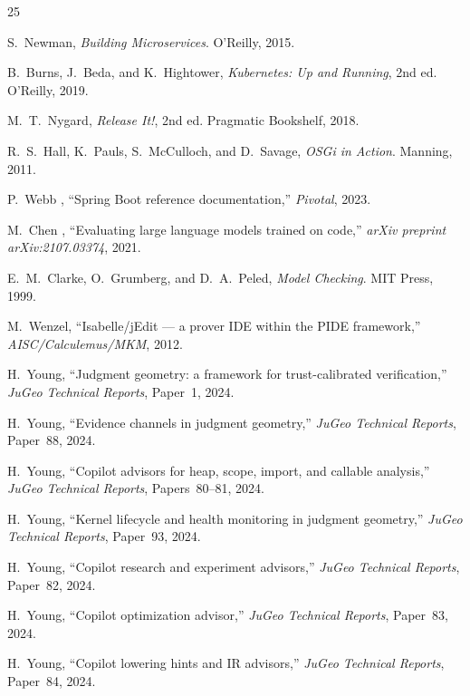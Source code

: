 \documentclass[11pt]{article}
\begin{document}
\begin{thebibliography}{25}

S.~Newman,
\emph{Building Microservices}.
O'Reilly, 2015.

B.~Burns, J.~Beda, and K.~Hightower,
\emph{Kubernetes: Up and Running}, 2nd ed.
O'Reilly, 2019.

M.~T.~Nygard,
\emph{Release It!}, 2nd ed.
Pragmatic Bookshelf, 2018.

R.~S.~Hall, K.~Pauls, S.~McCulloch, and D.~Savage,
\emph{OSGi in Action}.
Manning, 2011.

P.~Webb \etal{},
``Spring Boot reference documentation,''
\emph{Pivotal}, 2023.

M.~Chen \etal{},
``Evaluating large language models trained on code,''
\emph{arXiv preprint arXiv:2107.03374}, 2021.

E.~M.~Clarke, O.~Grumberg, and D.~A.~Peled,
\emph{Model Checking}.
MIT Press, 1999.

M.~Wenzel,
``Isabelle/jEdit --- a prover IDE within the PIDE framework,''
\emph{AISC/Calculemus/MKM}, 2012.

H.~Young,
``Judgment geometry: a framework for trust-calibrated
verification,''
\emph{JuGeo Technical Reports}, Paper~1, 2024.

H.~Young,
``Evidence channels in judgment geometry,''
\emph{JuGeo Technical Reports}, Paper~88, 2024.

H.~Young,
``Copilot advisors for heap, scope, import, and callable
analysis,''
\emph{JuGeo Technical Reports}, Papers~80--81, 2024.

H.~Young,
``Kernel lifecycle and health monitoring in judgment geometry,''
\emph{JuGeo Technical Reports}, Paper~93, 2024.

H.~Young,
``Copilot research and experiment advisors,''
\emph{JuGeo Technical Reports}, Paper~82, 2024.

H.~Young,
``Copilot optimization advisor,''
\emph{JuGeo Technical Reports}, Paper~83, 2024.

H.~Young,
``Copilot lowering hints and IR advisors,''
\emph{JuGeo Technical Reports}, Paper~84, 2024.


\end{thebibliography}
\end{document}
